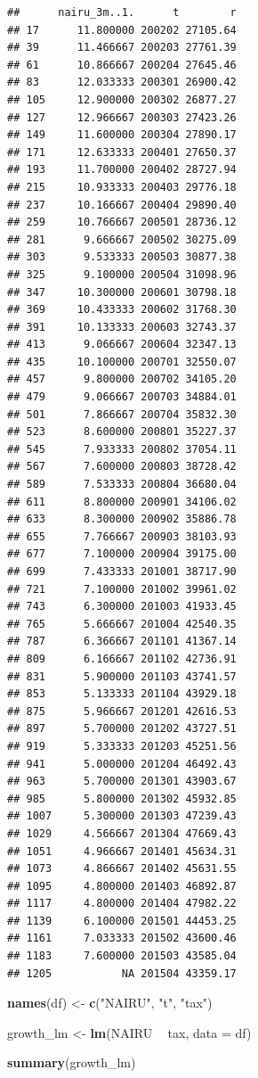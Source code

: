 \documentclass[]{article}
\newenvironment{Shaded}{\begin{snugshade}}{\end{snugshade}}
\newcommand{\DataTypeTok}[1]{\textcolor[rgb]{0.13,0.29,0.53}{#1}}
\newcommand{\KeywordTok}[1]{\textcolor[rgb]{0.13,0.29,0.53}{\textbf{#1}}}
\newcommand{\NormalTok}[1]{#1}
\newcommand{\OperatorTok}[1]{\textcolor[rgb]{0.81,0.36,0.00}{\textbf{#1}}}
\newcommand{\StringTok}[1]{\textcolor[rgb]{0.31,0.60,0.02}{#1}}
\begin{document}
\begin{verbatim}
##      nairu_3m..1.      t        r
## 17      11.800000 200202 27105.64
## 39      11.466667 200203 27761.39
## 61      10.866667 200204 27645.46
## 83      12.033333 200301 26900.42
## 105     12.900000 200302 26877.27
## 127     12.966667 200303 27423.26
## 149     11.600000 200304 27890.17
## 171     12.633333 200401 27650.37
## 193     11.700000 200402 28727.94
## 215     10.933333 200403 29776.18
## 237     10.166667 200404 29890.40
## 259     10.766667 200501 28736.12
## 281      9.666667 200502 30275.09
## 303      9.533333 200503 30877.38
## 325      9.100000 200504 31098.96
## 347     10.300000 200601 30798.18
## 369     10.433333 200602 31768.30
## 391     10.133333 200603 32743.37
## 413      9.066667 200604 32347.13
## 435     10.100000 200701 32550.07
## 457      9.800000 200702 34105.20
## 479      9.066667 200703 34884.01
## 501      7.866667 200704 35832.30
## 523      8.600000 200801 35227.37
## 545      7.933333 200802 37054.11
## 567      7.600000 200803 38728.42
## 589      7.533333 200804 36680.04
## 611      8.800000 200901 34106.02
## 633      8.300000 200902 35886.78
## 655      7.766667 200903 38103.93
## 677      7.100000 200904 39175.00
## 699      7.433333 201001 38717.90
## 721      7.100000 201002 39961.02
## 743      6.300000 201003 41933.45
## 765      5.666667 201004 42540.35
## 787      6.366667 201101 41367.14
## 809      6.166667 201102 42736.91
## 831      5.900000 201103 43741.57
## 853      5.133333 201104 43929.18
## 875      5.966667 201201 42616.53
## 897      5.700000 201202 43727.51
## 919      5.333333 201203 45251.56
## 941      5.000000 201204 46492.43
## 963      5.700000 201301 43903.67
## 985      5.800000 201302 45932.85
## 1007     5.300000 201303 47239.43
## 1029     4.566667 201304 47669.43
## 1051     4.966667 201401 45634.31
## 1073     4.866667 201402 45631.55
## 1095     4.800000 201403 46892.87
## 1117     4.800000 201404 47982.22
## 1139     6.100000 201501 44453.25
## 1161     7.033333 201502 43600.46
## 1183     7.600000 201503 43585.04
## 1205           NA 201504 43359.17
\end{verbatim}

\begin{Shaded}
\begin{Highlighting}[]
\KeywordTok{names}\NormalTok{(df) <-}\StringTok{ }\KeywordTok{c}\NormalTok{(}\StringTok{"NAIRU"}\NormalTok{, }\StringTok{"t"}\NormalTok{, }\StringTok{"tax"}\NormalTok{)}

\NormalTok{growth_lm <-}\StringTok{ }\KeywordTok{lm}\NormalTok{(NAIRU }\OperatorTok{~}\StringTok{ }\NormalTok{tax, }\DataTypeTok{data =}\NormalTok{ df)}

\KeywordTok{summary}\NormalTok{(growth_lm)}
\end{Highlighting}
\end{Shaded}
\end{document}
